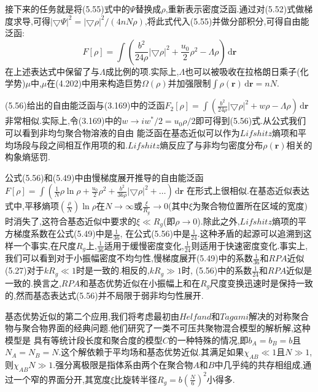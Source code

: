 接下来的任务就是将(5.55)式中的$\Psi$替换成$\rho$,重新表示密度泛函.通过对(5.52)式做梯度求导,可得$|\bigtriangledown\Psi|^2 = |\bigtriangledown\rho|^2/(4nN\rho)$,将此式代入(5.55)并做分部积分,可得自由能泛函:
\begin{equation}
F[\rho] = \int (\frac{b^2}{24\rho}|\bigtriangledown\rho|^2+\frac{u_0}{2}\rho^2-\Lambda\rho)\,\mathrm{d}\mathbf{r}
\end{equation}
在上述表达式中保留了与$\Lambda$成比例的项.实际上,$\Lambda$也可以被吸收在拉格朗日乘子(化学势)$\mu$中,$\mu$在(4.202)中用来构造巨势$\Omega(\rho)$并加强限制$\int \rho(\mathbf{r})\,\mathrm{d}\mathbf{r}=nN$.

(5.56)给出的自由能泛函与(3.169)中的泛函$F_2[\rho] = \int (\frac{b^2}{24\rho}|\bigtriangledown\rho |^2+w\rho-\Lambda\rho )\,\mathrm{d}\mathbf{r}$非常相似.实际上,令(3.169)中的$w\rightarrow iw^*/2 = u_0\rho/2$即可得到(5.56)式.从公式我们可以看到非均匀聚合物溶液的自由
能泛函在基态近似可以作为$Lifshitz$熵项和平均场段与段之间相互作用项的和.$Lifshitz$熵反应了与非均匀密度分布$\rho (\mathbf{r})$相关的构象熵惩罚.

公式(5.56)和(5.49)中由慢梯度展开推导的自由能泛函$F[\rho] = \int (\frac{1}{N}\rho\ln\rho+\frac{u_0}{2}\rho^2+\frac{b^2}{36\rho}|\bigtriangledown\rho|^2+\dots)\,\mathrm{d}\mathbf{r}$ 在形式上很相似.在基态近似表达式中,平移熵项$(\frac{\rho}{N})\ln \rho$在$N\rightarrow\infty$或$\frac{\xi}{R_g}\rightarrow0$(其中$\xi $为聚合物位置所在区域的宽度)时消失了,这符合基态近似中要求的$\xi \ll R_g$(即$\rho\rightarrow0$).除此之外,$Lifshitz$熵项的平方梯度系数在公式(5.49)中是$\frac{1}{36}$, 在公式(5.56)中是$\frac{1}{24}$.这种矛盾的起源可以追溯到这样一个事实,在尺度$R_g$上,$\frac{1}{36}$适用于缓慢密度变化,$\frac{1}{24}$则适用于快速密度变化.事实上,我们可以看到对于小振幅密度不均匀性,慢梯度展开(5.49)中的系数$\frac{1}{36}$和$RPA$近似(5.27)对于$kR_g\ll1$时是一致的.相反的,$kR_g \gg 1$时,
(5.56)中的系数$\frac{1}{24}$和$RPA$近似是一致的.换言之,$RPA$和基态优势近似在小振幅上和在$R_g$尺度变换迅速时是保持一致的,然而基态表达式(5.56)并不局限于弱非均匀性展开.

基态优势近似的第二个应用,我们将考虑最初由$Helfand$和$Tagami$解决的对称聚合物与聚合物界面的经典问题.他们研究了一类不可压共聚物混合模型的解析解,这种模型是 具有等统计段长度和聚合度的模型$C$的一种特殊的情况,即$b_A=b_B=b$且$N_A=N_B=N$.这个解依赖于平均场和基态优势近似.其满足如果$\chi_{AB}\ll1$且$N\gg1$,则$\chi_{AB}N\gg1$.强分离极限是指体系由两个在聚合物$A$和$B$中几乎纯的共存相组成,通过一个窄的界面分开,其宽度$\xi$比旋转半径$R_g=b(\frac{N}{6})^2$小得多.

